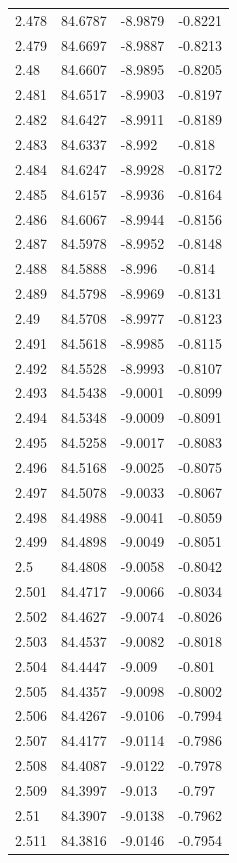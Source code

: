 \begin{tabular}{llll}
2.478 & 84.6787 & -8.9879 & -0.8221 \\
2.479 & 84.6697 & -8.9887 & -0.8213 \\
2.48 & 84.6607 & -8.9895 & -0.8205 \\
2.481 & 84.6517 & -8.9903 & -0.8197 \\
2.482 & 84.6427 & -8.9911 & -0.8189 \\
2.483 & 84.6337 & -8.992 & -0.818 \\
2.484 & 84.6247 & -8.9928 & -0.8172 \\
2.485 & 84.6157 & -8.9936 & -0.8164 \\
2.486 & 84.6067 & -8.9944 & -0.8156 \\
2.487 & 84.5978 & -8.9952 & -0.8148 \\
2.488 & 84.5888 & -8.996 & -0.814 \\
2.489 & 84.5798 & -8.9969 & -0.8131 \\
2.49 & 84.5708 & -8.9977 & -0.8123 \\
2.491 & 84.5618 & -8.9985 & -0.8115 \\
2.492 & 84.5528 & -8.9993 & -0.8107 \\
2.493 & 84.5438 & -9.0001 & -0.8099 \\
2.494 & 84.5348 & -9.0009 & -0.8091 \\
2.495 & 84.5258 & -9.0017 & -0.8083 \\
2.496 & 84.5168 & -9.0025 & -0.8075 \\
2.497 & 84.5078 & -9.0033 & -0.8067 \\
2.498 & 84.4988 & -9.0041 & -0.8059 \\
2.499 & 84.4898 & -9.0049 & -0.8051 \\
2.5 & 84.4808 & -9.0058 & -0.8042 \\
2.501 & 84.4717 & -9.0066 & -0.8034 \\
2.502 & 84.4627 & -9.0074 & -0.8026 \\
2.503 & 84.4537 & -9.0082 & -0.8018 \\
2.504 & 84.4447 & -9.009 & -0.801 \\
2.505 & 84.4357 & -9.0098 & -0.8002 \\
2.506 & 84.4267 & -9.0106 & -0.7994 \\
2.507 & 84.4177 & -9.0114 & -0.7986 \\
2.508 & 84.4087 & -9.0122 & -0.7978 \\
2.509 & 84.3997 & -9.013 & -0.797 \\
2.51 & 84.3907 & -9.0138 & -0.7962 \\
2.511 & 84.3816 & -9.0146 & -0.7954 \\

\end{tabular}
